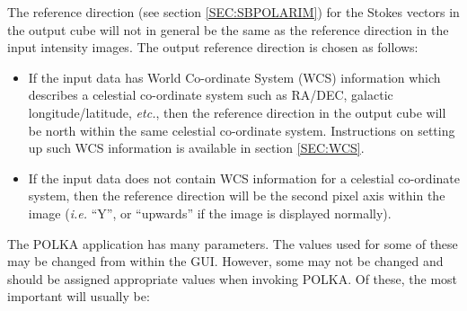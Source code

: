 \documentclass[twoside,11pt]{article}
\newcommand{\hyperref}[4]{#2\ref{#4}#3}
\renewcommand{\_}{\texttt{\symbol{95}}}
\begin{document}
The reference direction (see \hyperref{this section}{section }
{}{SEC:SBPOLARIM}) for the Stokes vectors in the output cube will
not in general be the same as the reference direction in the input 
intensity images. The output reference direction is chosen as follows:

\begin{itemize}
\item If the input data has World Co-ordinate System (WCS) information
which describes a celestial co-ordinate system such as RA/DEC, galactic 
longitude/latitude, \emph{etc.}, then the reference direction in the output cube
will be north within the same celestial co-ordinate system.
Instructions on setting up such WCS information is available
\hyperref{here}{in section }{}{SEC:WCS}.

\item If the input data does not contain WCS information for a celestial
co-ordinate system, then the reference direction will be the second pixel
axis within the image (\emph{i.e.} ``Y'', or ``upwards'' if the image is
displayed normally).
\end{itemize}

The POLKA application has many parameters. The values used for some of
these may be changed from within the GUI. However, some may not be
changed and should be assigned appropriate values when invoking POLKA.
Of these, the most important will usually be:
\end{document}
